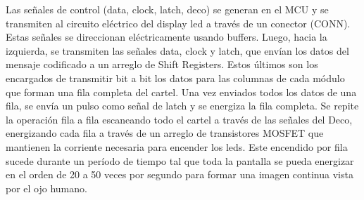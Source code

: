 Las señales de control (data, clock, latch, deco) se generan en el MCU y se transmiten al circuito eléctrico del display led a través de un conector (CONN). Estas señales se direccionan eléctricamente usando buffers. Luego, hacia la izquierda, se transmiten las señales data, clock y latch, que envían los datos del mensaje codificado a un arreglo de Shift Registers. Estos últimos son los encargados de transmitir bit a bit los datos para las columnas de cada módulo que forman una fila completa del cartel. Una vez enviados todos los datos de una fila, se envía un pulso como señal de latch y se energiza la fila completa. Se repite la operación fila a fila escaneando todo el cartel a través de las señales del Deco, energizando cada fila a través de un arreglo de transistores MOSFET que mantienen la corriente necesaria para encender los leds. Este encendido por fila sucede durante un período de tiempo tal que toda la pantalla se pueda energizar en el orden de 20 a 50 veces por segundo para formar una imagen continua vista por el ojo humano.\\

